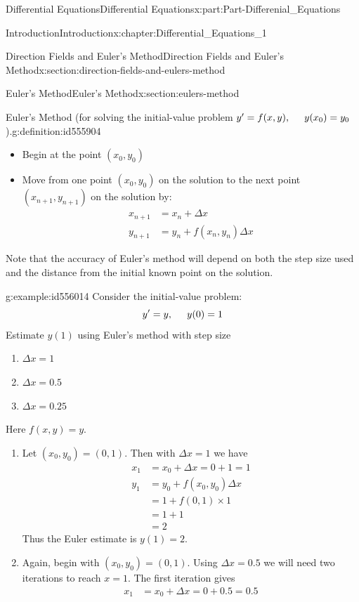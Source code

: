 \documentclass[oneside,10pt,]{book}
\newcommand{\terminology}[1]{\textbf{#1}}
\numberwithin{equation}{section}
\newcommand{\amp}{&}
\begin{document}
\begin{partptx}{Differential Equations}{}{Differential Equations}{}{}{x:part:Part-Differenial_Equations}
\begin{chapterptx}{Introduction}{}{Introduction}{}{}{x:chapter:Differential_Equations_1}
\begin{sectionptx}{Direction Fields and Euler's Method}{}{Direction Fields and Euler's Method}{}{}{x:section:direction-fields-and-eulers-method}
\begin{sectionptx}{Euler's Method}{}{Euler's Method}{}{}{x:section:eulers-method}
\begin{definition}{Euler's Method (for solving the initial-value problem \(y'=f(x,y), \hspace{5mm} y(x_0)=y_0\)).}{g:definition:id555904}
\begin{itemize}[label=\textbullet]
\item{}Begin at the point \terminology{\((x_0,y_0)\)}%
\item{}Move from one point \terminology{\((x_0,y_0)\)} on the solution to the next point \terminology{\((x_{n+1},y_{n+1})\)} on the solution by: %
\begin{align*}
x_{n+1} \amp =x_n+\Delta x\\
y_{n+1} \amp =y_n+f(x_n,y_n)\Delta x
\end{align*}
%
%
\end{itemize}
%
\end{definition}
Note that the accuracy of Euler’s method will depend on both the step size used and the distance from the initial known point on the solution.%
\begin{example}{}{g:example:id556014}%
Consider the initial-value problem:%
\begin{equation*}
y'=y, \hspace{5mm} y(0)=1
\end{equation*}
Estimate \(y(1)\) using Euler’s method with step size%
\par
%
\begin{enumerate}[label=\alph*.]
\item{}\(\displaystyle \Delta x=1\)%
\item{}\(\displaystyle \Delta x=0.5\)%
\item{}\(\displaystyle \Delta x=0.25\)%
\end{enumerate}
%
\par\smallskip%
\noindent\hypertarget{g:solution:id555994}{}Here \(f(x,y)=y\).%
\par
%
\begin{enumerate}[label=\alph*.]
\item{}Let \((x_0,y_0)=(0,1)\). Then with \(\Delta x=1\) we have %
\begin{align*}
x_1 \amp =x_0+\Delta x=0+1=1\\
y_1 \amp =y_0+f(x_0,y_0)\Delta x\\
\amp = 1+f(0,1)\times 1\\
\amp = 1+1\\
\amp = 2
\end{align*}
%
 Thus the Euler estimate is \(y(1)=2\).%
\item{}Again, begin with \((x_0,y_0)=(0,1)\). Using \(\Delta x=0.5\) we will need two iterations to reach \(x=1\). The first iteration gives %
\begin{align*}
x_1 \amp =x_0+\Delta x=0+0.5=0.5\\

\end{align*}
\end{enumerate}
\end{example}
\end{sectionptx}
\end{sectionptx}
\end{chapterptx}
\end{partptx}
\end{document}

